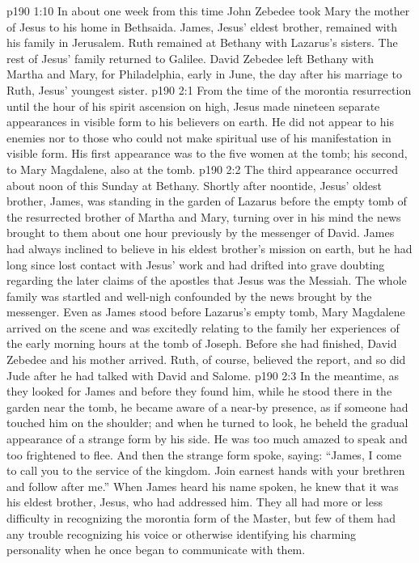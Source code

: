 \vs p190 1:10 In about one week from this time John Zebedee took Mary the mother of Jesus to his home in Bethsaida. James, Jesus’ eldest brother, remained with his family in Jerusalem. Ruth remained at Bethany with Lazarus’s sisters. The rest of Jesus’ family returned to Galilee. David Zebedee left Bethany with Martha and Mary, for Philadelphia, early in June, the day after his marriage to Ruth, Jesus’ youngest sister.
\vs p190 2:1 From the time of the morontia resurrection until the hour of his spirit ascension on high, Jesus made nineteen separate appearances in visible form to his believers on earth. He did not appear to his enemies nor to those who could not make spiritual use of his manifestation in visible form. His first appearance was to the five women at the tomb; his second, to Mary Magdalene, also at the tomb.
\vs p190 2:2 The third appearance occurred about noon of this Sunday at Bethany. Shortly after noontide, Jesus’ oldest brother, James, was standing in the garden of Lazarus before the empty tomb of the resurrected brother of Martha and Mary, turning over in his mind the news brought to them about one hour previously by the messenger of David. James had always inclined to believe in his eldest brother’s mission on earth, but he had long since lost contact with Jesus’ work and had drifted into grave doubting regarding the later claims of the apostles that Jesus was the Messiah. The whole family was startled and well\hyp{}nigh confounded by the news brought by the messenger. Even as James stood before Lazarus’s empty tomb, Mary Magdalene arrived on the scene and was excitedly relating to the family her experiences of the early morning hours at the tomb of Joseph. Before she had finished, David Zebedee and his mother arrived. Ruth, of course, believed the report, and so did Jude after he had talked with David and Salome.
\vs p190 2:3 In the meantime, as they looked for James and before they found him, while he stood there in the garden near the tomb, he became aware of a near\hyp{}by presence, as if someone had touched him on the shoulder; and when he turned to look, he beheld the gradual appearance of a strange form by his side. He was too much amazed to speak and too frightened to flee. And then the strange form spoke, saying: \textcolor{ubdarkred}{“James, I come to call you to the service of the kingdom. Join earnest hands with your brethren and follow after me.”} When James heard his name spoken, he knew that it was his eldest brother, Jesus, who had addressed him. They all had more or less difficulty in recognizing the morontia form of the Master, but few of them had any trouble recognizing his voice or otherwise identifying his charming personality when he once began to communicate with them.

